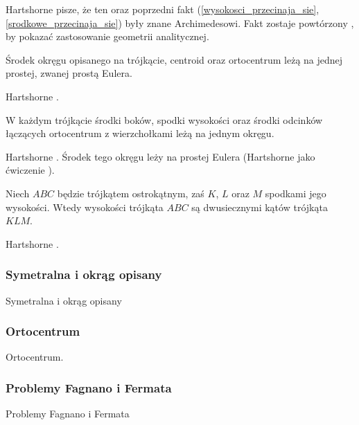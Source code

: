 Hartshorne \cite[s. 52, 54]{hartshorne2000} pisze, że ten oraz poprzedni fakt (\ref{wysokosci_przecinaja_sie}, \ref{srodkowe_przecinaja_sie}) były znane Archimedesowi.
Fakt zostaje powtórzony \cite[s. 119-120]{hartshorne2000}, by pokazać zastosowanie geometrii analitycznej.

\begin{proposition}
	\label{prosta_eulera}
	Środek okręgu opisanego na trójkącie, centroid oraz ortocentrum leżą na jednej prostej, zwanej prostą Eulera.
\end{proposition}

Hartshorne \cite[s. 54, 55]{hartshorne2000}.

\begin{proposition}
	\label{okrag_dziewieciu_punktow}
	W każdym trójkącie środki boków, spodki wysokości oraz środki odcinków łączących ortocentrum z wierzchołkami leżą na jednym okręgu.
\end{proposition}

Hartshorne \cite[s. 57]{hartshorne2000}.
Środek tego okręgu leży na prostej Eulera (Hartshorne jako ćwiczenie \cite[s. 60]{hartshorne2000}).

\begin{proposition}
	\label{orthic_triangle}
	Niech $ABC$ będzie trójkątem ostrokątnym, zaś $K$, $L$ oraz $M$ spodkami jego wysokości.
	Wtedy wysokości trójkąta $ABC$ są dwusiecznymi kątów trójkąta $KLM$.
\end{proposition}

Hartshorne \cite[s. 58]{hartshorne2000}.



\subsubsection{Symetralna i okrąg opisany}
Symetralna i okrąg opisany
\loremipsum

\subsubsection{Ortocentrum}
Ortocentrum.
\loremipsum





\loremipsum

\subsubsection{Problemy Fagnano i Fermata}
Problemy Fagnano i Fermata
\loremipsum